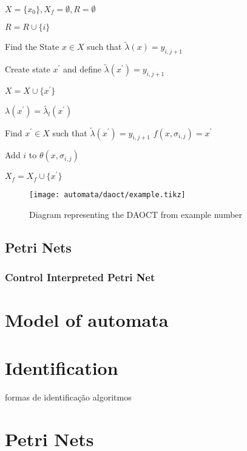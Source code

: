 {\begin{algorithm2e}
$X = \{ x_0\}, X_f = \emptyset, R = \emptyset$

{
  $R = R \cup \{ i \}$
  
{
  Find the State $x \in X $ such that $\tilde{\lambda}(x) = y_{i,j+1}$

  { Create state $x^\prime$ and define $\tilde{\lambda}(x^\prime) = y_{i,j+1}$

$X = X \cup \{ x^\prime\}$

$\lambda(x^\prime) = \tilde{\lambda_l}(x^\prime)$

}
{
  Find $x^\prime \in X$ such that $\tilde{\lambda}(x^\prime) = y_{i,j+1}$
}
$f(x,\sigma_{i,j}) = x^\prime$

Add $i$ to $\theta(x,\sigma_{i,j})$

{
  $X_f = X_f \cup \{x^\prime\}$
}
}
}
\end{algorithm2e}



\begin{figure}[H]
  \centering
  \texttt{[image: automata/daoct/example.tikz]}
  \caption{Diagram representing the DAOCT from example number }
\end{figure}

\subsection{Petri Nets}
\label{sec:petriNets}
\subsubsection{Control Interpreted Petri Net}

\section{Model of automata}

\section{Identification}
  formas de identificação
  algoritmos

}
\section{Petri Nets}
\label{sec:petriNets}


